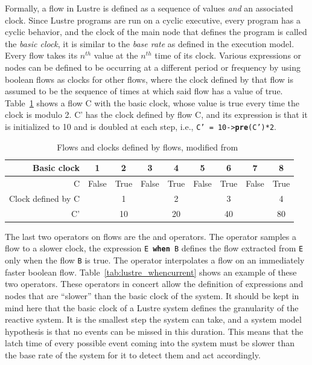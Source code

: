 Formally, a flow in Lustre is defined as a sequence of values
\emph{and} an associated clock. Since Lustre programs are run on a
cyclic executive, every program has a cyclic behavior, and the clock
of the main node that defines the program is called the \emph{basic
  clock}, it is similar to the \emph{base rate} as defined in the
\simu execution model. Every flow takes its $n^{th}$ value at the
$n^{th}$ time of its clock. Various expressions or nodes can be
defined to be occurring at a different period or frequency by using
boolean flows as clocks for other flows, where the clock defined by
that flow is assumed to be the sequence of times at which said flow
has a value of true. Table~\ref{tab:lustre_clocks} shows a flow C with
the basic clock, whose value is true every time the clock is modulo
2. C' has the clock defined by flow C, and its expression is that it
is initialized to 10 and is doubled at each step, i.e., \texttt{C' =
  10->\textbf{pre}(C')*2}.

\begin{table}
\centering
\begin{tabular}{r|c|c|c|c|c|c|c|c}
\hline
Basic clock & 1 & 2 & 3 & 4 & 5 & 6 & 7 & 8\\
\hline
C & False & True & False & True & False & True & False & True\\
\hline
Clock defined by C & & 1 & & 2 & & 3 & & 4\\
\hline
C' & & 10 & & 20 & & 40 & & 80\\
\hline
\end{tabular}
\caption{Flows and clocks defined by flows, modified
  from~\cite{halbwachs@ieee91}}
\label{tab:lustre_clocks}
\end{table}

The last two operators on flows are the  and 
operators. The  operator samples a flow to a slower clock,
the expression \texttt{E \textbf{when} B} defines the flow extracted
from \texttt{E} only when the flow \texttt{B} is true. The
 operator interpolates a flow on an immediately faster
boolean flow. Table~\ref{tab:lustre_whencurrent} shows an example of
these two operators. These operators in concert allow the definition
of expressions and nodes that are ``slower'' than the basic clock of
the system. It should be kept in mind here that the basic clock of a
Lustre system defines the granularity of the reactive system. It is
the smallest step the system can take, and a system model hypothesis
is that no events can be missed in this duration. This means that the
latch time of every possible event coming into the system must be
slower than the base rate of the system for it to detect them and act
accordingly.

